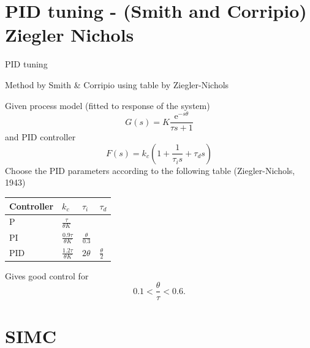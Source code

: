 \documentclass[presentation,aspectratio=169, usenames, dvipsnames]{beamer}
\begin{document}
\section{PID tuning - (Smith and Corripio) Ziegler Nichols}
\label{sec:orga158d8d}
\begin{frame}[label={sec:orgd1f6a5d}]{PID tuning}
\end{frame}
\begin{frame}[label={sec:org71a4d7d}]{Method by Smith \& Corripio using table by Ziegler-Nichols}
\small

Given process model (fitted to response of the system) \[ G(s) = K \frac{\mathrm{e}^{-s\theta}}{\tau s + 1} \] and PID controller
   \[ F(s) = k_c\left( 1 + \frac{1}{\tau_i s} + \tau_d s\right) \]
   Choose the PID parameters according to the following table (Ziegler-Nichols, 1943)
   \begin{center}
   \setlength{\tabcolsep}{20pt}
   \renewcommand{\arraystretch}{1.5}
   \begin{tabular}{llll}
   Controller & \(k_c\) & \(\tau_i\) & \(\tau_d\)\\
  \hline\hline
  P & \(\frac{\tau}{\theta K}\) &  & \\
  PI & \(\frac{0.9\tau}{\theta K}\) & \(\frac{\theta}{0.3}\) & \\
  PID & \(\frac{1.2\tau}{\theta K}\) & \(2\theta\) & \(\frac{\theta}{2}\)\\
  \hline
\end{tabular}
\end{center}

Gives good control for \[0.1 < \frac{\theta}{\tau} < 0.6.\]
\end{frame}



\section{SIMC}
\label{sec:org627d95f}
\end{document}
